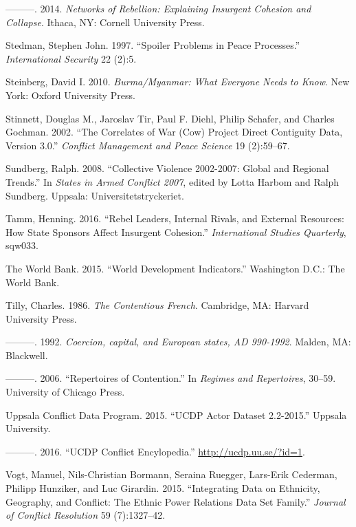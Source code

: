 \documentclass[12pt,]{book}
\theoremstyle{definition}
\theoremstyle{definition}
\theoremstyle{definition}
\theoremstyle{remark}
\begin{document}
\leavevmode\hypertarget{ref-Staniland2014}{}%
---------. 2014. \emph{Networks of Rebellion: Explaining Insurgent
Cohesion and Collapse}. Ithaca, NY: Cornell University Press.

\leavevmode\hypertarget{ref-Stedman1997}{}%
Stedman, Stephen John. 1997. ``Spoiler Problems in Peace Processes.''
\emph{International Security} 22 (2):5.

\leavevmode\hypertarget{ref-Steinberg2010}{}%
Steinberg, David I. 2010. \emph{Burma/Myanmar: What Everyone Needs to
Know}. New York: Oxford University Press.

\leavevmode\hypertarget{ref-Stinnett2002a}{}%
Stinnett, Douglas M., Jaroslav Tir, Paul F. Diehl, Philip Schafer, and
Charles Gochman. 2002. ``The Correlates of War (Cow) Project Direct
Contiguity Data, Version 3.0.'' \emph{Conflict Management and Peace
Science} 19 (2):59--67.

\leavevmode\hypertarget{ref-Sundberg2008a}{}%
Sundberg, Ralph. 2008. ``Collective Violence 2002-2007: Global and
Regional Trends.'' In \emph{States in Armed Conflict 2007}, edited by
Lotta Harbom and Ralph Sundberg. Uppsala: Universitetstryckeriet.

\leavevmode\hypertarget{ref-Tamm2016}{}%
Tamm, Henning. 2016. ``Rebel Leaders, Internal Rivals, and External
Resources: How State Sponsors Affect Insurgent Cohesion.''
\emph{International Studies Quarterly}, sqw033.

\leavevmode\hypertarget{ref-WorldBank2015}{}%
The World Bank. 2015. ``World Development Indicators.'' Washington D.C.:
The World Bank.

\leavevmode\hypertarget{ref-Tilly1986}{}%
Tilly, Charles. 1986. \emph{The Contentious French}. Cambridge, MA:
Harvard University Press.

\leavevmode\hypertarget{ref-Tilly1992}{}%
---------. 1992. \emph{Coercion, capital, and European states, AD
990-1992}. Malden, MA: Blackwell.

\leavevmode\hypertarget{ref-Tilly2006}{}%
---------. 2006. ``Repertoires of Contention.'' In \emph{Regimes and
Repertoires}, 30--59. University of Chicago Press.

\leavevmode\hypertarget{ref-ucdpactor}{}%
Uppsala Conflict Data Program. 2015. ``UCDP Actor Dataset 2.2-2015.''
Uppsala University.

\leavevmode\hypertarget{ref-UCDPEncyclopedia}{}%
---------. 2016. ``UCDP Conflict Encylopedia.''
\url{http://ucdp.uu.se/?id=1}.

\leavevmode\hypertarget{ref-Vogt2015}{}%
Vogt, Manuel, Nils-Christian Bormann, Seraina Ruegger, Lars-Erik
Cederman, Philipp Hunziker, and Luc Girardin. 2015. ``Integrating Data
on Ethnicity, Geography, and Conflict: The Ethnic Power Relations Data
Set Family.'' \emph{Journal of Conflict Resolution} 59 (7):1327--42.
\end{document}
